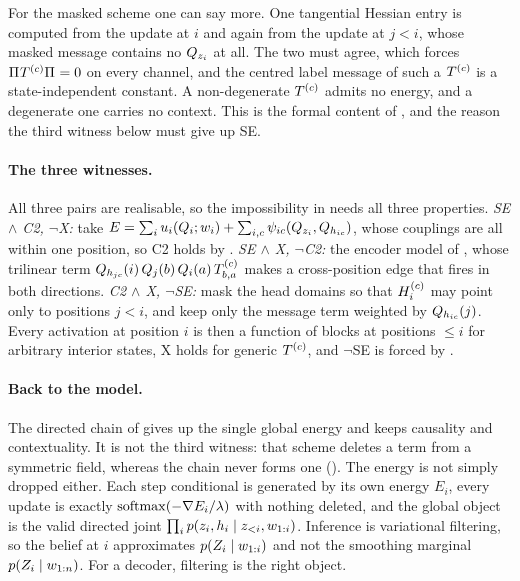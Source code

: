 For the masked scheme one can say more. One tangential Hessian entry is computed from the update
at $i$ and again from the update at $j<i$, whose masked message contains no $Q_{z_i}$ at all.
The two must agree, which forces $\Pi_{}T^{(c)}\Pi_{} = 0$ on every channel, and the centred
label message of such a $T^{(c)}$ is a state-independent constant. A non-degenerate
$T^{(c)}$ admits no energy, and a degenerate one carries no context. This is the formal content
of , and the reason the third witness below must give up SE.

\paragraph{The three witnesses.}
All three pairs are realisable, so the impossibility in  needs all three
properties. \emph{SE $\wedge$ C2, $\neg$X:} take
$E = \sum_i u_i(Q_i;w_i) + \sum_{i,c}\psi_{ic}(Q_{z_i},Q_{h_{ic}})$, whose couplings are all
within one position, so C2 holds by . \emph{SE $\wedge$ X, $\neg$C2:} the
encoder model of \citet{wu2023probabilistic}, whose trilinear term
$Q_{h_{jc}}(i)\,Q_j(b)\,Q_i(a)\,T^{(c)}_{b,a}$ makes a cross-position edge that
 fires in both directions. \emph{C2 $\wedge$ X, $\neg$SE:} mask the head
domains so that $H_{i}^{(c)}$ may point only to positions $j<i$, and keep only the message term
weighted by $Q_{h_{ic}}(j)$. Every activation at position $i$ is then a function of blocks at
positions $\leq i$ for arbitrary interior states, X holds for generic $T^{(c)}$, and $\neg$SE is
forced by .

\paragraph{Back to the model.}
The directed chain of  gives up the single global energy and keeps causality and
contextuality. It is not the third witness: that scheme deletes a term from a symmetric field,
whereas the chain never forms one (). The energy is not simply dropped
either. Each step conditional is generated by its own energy $E_i$, every update is exactly
$\operatorname{softmax}(-\nabla E_i/\lambda)$ with nothing deleted, and the global object is the valid directed
joint $\prod_i p(z_i, h_i \mid z_{{<}i}, w_{1:i})$. Inference is variational filtering, so
the belief at $i$ approximates $p(Z_{i} \mid w_{1:i})$ and not the smoothing marginal
$p(Z_{i} \mid w_{1:n})$. For a decoder, filtering is the right object.
